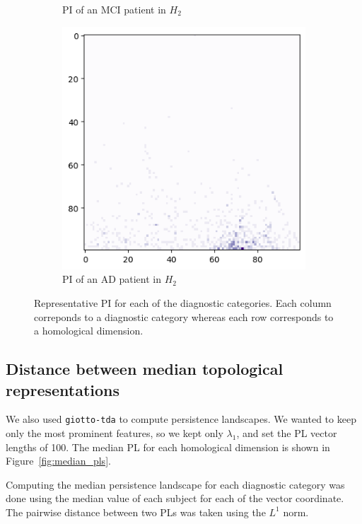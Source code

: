 \documentclass{article}
\begin{document}
\begin{figure}[htb]
\begin{subfigure}{0.32\textwidth}
    \caption{PI of an MCI patient in $H_2$}
  \end{subfigure}
  \begin{subfigure}{0.32\textwidth}
    \includegraphics[width=\textwidth]{figures/representative_samples/Persistence_image_AD_h_2.png}
    \caption{PI of an AD patient in $H_2$}
  \end{subfigure}
  \caption{Representative PI for each of the diagnostic categories. Each column correponds to a
    diagnostic category whereas each row corresponds to a homological dimension.}
  \label{fig:sample_rep_pi}
\end{figure}

\subsection{Distance between median topological representations}

We also used \texttt{giotto-tda} to compute persistence landscapes. We wanted to keep only the most
prominent features, so we kept only $\lambda_1$, and set the PL vector lengths of 100. The
median PL for each homological dimension is shown in Figure~\ref{fig:median_pls}.

Computing the median persistence landscape for each diagnostic category was done using the median
value of each subject for each of the vector coordinate. The pairwise distance between two PLs was
taken using the $L^1$ norm.
\end{document}
